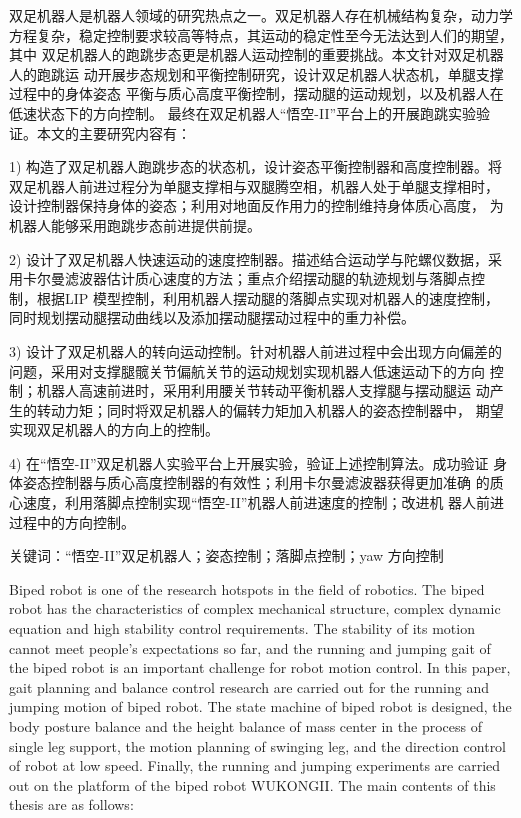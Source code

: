 \cleardoublepage
{}
双足机器人是机器人领域的研究热点之一。双足机器人存在机械结构复杂，动力学
方程复杂，稳定控制要求较高等特点，其运动的稳定性至今无法达到人们的期望，其中
双足机器人的跑跳步态更是机器人运动控制的重要挑战。本文针对双足机器人的跑跳运
动开展步态规划和平衡控制研究，设计双足机器人状态机，单腿支撑过程中的身体姿态
平衡与质心高度平衡控制，摆动腿的运动规划，以及机器人在低速状态下的方向控制。
最终在双足机器人“悟空-II”平台上的开展跑跳实验验证。本文的主要研究内容有：

1) 构造了双足机器人跑跳步态的状态机，设计姿态平衡控制器和高度控制器。将
双足机器人前进过程分为单腿支撑相与双腿腾空相，机器人处于单腿支撑相时，
设计控制器保持身体的姿态；利用对地面反作用力的控制维持身体质心高度，
为机器人能够采用跑跳步态前进提供前提。

2) 设计了双足机器人快速运动的速度控制器。描述结合运动学与陀螺仪数据，采
用卡尔曼滤波器估计质心速度的方法；重点介绍摆动腿的轨迹规划与落脚点控
制，根据LIP 模型控制，利用机器人摆动腿的落脚点实现对机器人的速度控制，
同时规划摆动腿摆动曲线以及添加摆动腿摆动过程中的重力补偿。

3) 设计了双足机器人的转向运动控制。针对机器人前进过程中会出现方向偏差的
问题，采用对支撑腿髋关节偏航关节的运动规划实现机器人低速运动下的方向
控制；机器人高速前进时，采用利用腰关节转动平衡机器人支撑腿与摆动腿运
动产生的转动力矩；同时将双足机器人的偏转力矩加入机器人的姿态控制器中，
期望实现双足机器人的方向上的控制。

4) 在“悟空-II”双足机器人实验平台上开展实验，验证上述控制算法。成功验证
身体姿态控制器与质心高度控制器的有效性；利用卡尔曼滤波器获得更加准确
的质心速度，利用落脚点控制实现“悟空-II”机器人前进速度的控制；改进机
器人前进过程中的方向控制。

关键词：“悟空-II”双足机器人；姿态控制；落脚点控制；yaw 方向控制

\cleardoublepage
{}
Biped robot is one of the research hotspots in the field of robotics. The biped robot has the
characteristics of complex mechanical structure, complex dynamic equation and high stability
control requirements. The stability of its motion cannot meet people's expectations so far, and
the running and jumping gait of the biped robot is an important challenge for robot motion
control. In this paper, gait planning and balance control research are carried out for the running
and jumping motion of biped robot. The state machine of biped robot is designed, the body
posture balance and the height balance of mass center in the process of single leg support, the
motion planning of swinging leg, and the direction control of robot at low speed. Finally, the
running and jumping experiments are carried out on the platform of the biped robot WUKONGII.
The main contents of this thesis are as follows:


